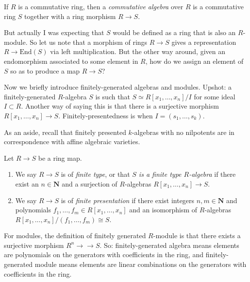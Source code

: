 \begin{definition}
\label{definition-algebra}
\begin{reference}
\cite{Eisenbud}
\end{reference}
If $R$ is a commutative ring,
then a {\it commutative algebra} over $R$
is a commutative ring $S$ together
with a ring morphism $R \to S$.
\end{definition}

\noindent
But actually I was expecting that
$S$ would be defined as
a ring that is also an $R$-module.
So let us note that a morphism of rings
$R \to S$ gives a representation
$R \to \text{End}(S)$ via left
multiplication.
But the other way around,
given an endomorphism associated
to some element in $R$,
how do we assign an element of $S$
so as to produce a map $R \to S$?

\medskip\noindent
Now we briefly introduce finitely-generated
algebras and modules.
Upshot: a finitely-generated $R$-algebra
$S$ is such that $S \simeq
R[x_1,\ldots,x_n]/I$ for some ideal $I
\subset R$. Another way of saying this is
that there is a surjective morphism
$R[x_1,…,x_n]\to S$. Finitely-presentedness
is when $I = (s_1,\ldots,s_k)$.

As an aside, recall that finitely presented
$k$-algebras with no nilpotents are in
correspondence with
affine algebraic varieties.

\begin{definition}
\label{definition-finite-type}
Let $R \to S$ be a ring map.
\begin{enumerate}
\item We say $R \to S$ is of {\it finite
type},
or that {\it $S$ is a finite
type $R$-algebra} if there exist an $n \in
\mathbf{N}$
and a surjection
of $R$-algebras $R[x_1, \ldots, x_n] \to S$.
\item We say $R \to S$ is of
{\it finite presentation} if there
exist integers $n, m \in \mathbf{N}$ and
polynomials
$f_1, \ldots, f_m \in R[x_1, \ldots, x_n]$
and an isomorphism of $R$-algebras
$R[x_1, \ldots, x_n]/(f_1, \ldots, f_m) \cong
S$.
\end{enumerate}
\end{definition}

\noindent
For modules, the definition of
finitely generated $R$-module is that there
exists a surjective morphism $R^n
\to\!\!\!\!\!\to S$.
So: finitely-generated
algebra means elements are polynomials on
the generators with coefficients in the
ring, and finitely-generated
module means elements are
linear combinations on the generators with
coefficients in the ring.


